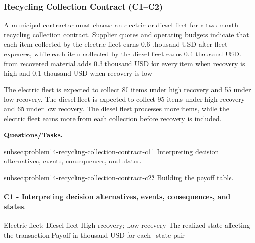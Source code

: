 	\subsubsection{Recycling Collection Contract (C1--C2)}
	\label{sec:problem14-recycling-collection-contract-c1-c2}
	
	A municipal contractor must choose an electric or diesel fleet for a two-month recycling collection contract. Supplier quotes and operating budgets indicate that each item collected by the electric fleet earns 0.6 thousand USD after fleet expenses, while each item collected by the diesel fleet earns 0.4 thousand USD.  from recovered material adds 0.3 thousand USD for every item when recovery is high and 0.1 thousand USD when recovery is low.
	
	The electric fleet is expected to collect 80 items under high recovery and 55 under low recovery. The diesel fleet is expected to collect 95 items under high recovery and 65 under low recovery. The diesel fleet processes more items, while the electric fleet earns more from each collection before recovery  is included.

	\textbf{Questions/Tasks.}
	\begin{enumerate}
	\CriterionTask
	{subsec:problem14-recycling-collection-contract-c1}{1}
	{Interpreting decision alternatives, events, consequences, and states.}

	\CriterionTask
	{subsec:problem14-recycling-collection-contract-c2}{2}
	{Building the payoff table.}
	\end{enumerate}

\paragraph*{C1 - Interpreting decision alternatives, events, consequences, and states.}
	\label{subsec:problem14-recycling-collection-contract-c1}
	\DecisionElementsTable
	{Electric fleet; Diesel fleet}
	{High recovery; Low recovery}
	{The realized state affecting the transaction}
	{Payoff in thousand USD for each --state pair}

